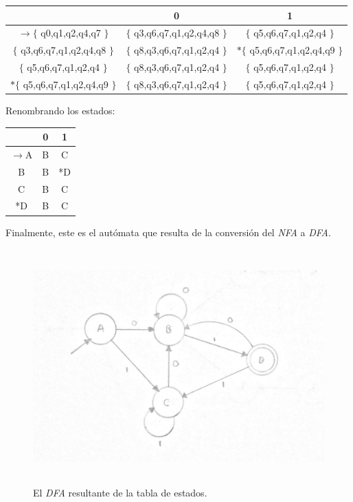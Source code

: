 \documentclass[12pt]{article}
\begin{document}
\begin{table}[H]
\centering
\begin{tabular}{|c|c|c|}
\hline 
 & 0 & 1 \\ 
\hline 
$\rightarrow\lbrace$ q0,q1,q2,q4,q7 $\rbrace$ & $\lbrace$ q3,q6,q7,q1,q2,q4,q8 $\rbrace$ & $\lbrace$ q5,q6,q7,q1,q2,q4 $\rbrace$ \\ 
\hline 
$\lbrace$ q3,q6,q7,q1,q2,q4,q8 $\rbrace$ & $\lbrace$ q8,q3,q6,q7,q1,q2,q4 $\rbrace$ & $*\lbrace$ q5,q6,q7,q1,q2,q4,q9 $\rbrace$ \\ 
\hline 
$\lbrace$ q5,q6,q7,q1,q2,q4 $\rbrace$ & $\lbrace$ q8,q3,q6,q7,q1,q2,q4 $\rbrace$ & $\lbrace$ q5,q6,q7,q1,q2,q4 $\rbrace$ \\ 
\hline 
$*\lbrace$ q5,q6,q7,q1,q2,q4,q9 $\rbrace$ & $\lbrace$ q8,q3,q6,q7,q1,q2,q4 $\rbrace$ & $\lbrace$ q5,q6,q7,q1,q2,q4 $\rbrace$ \\ 
\hline 
\end{tabular} 
\end{table}

\vspace{1em}
Renombrando los estados: \\

\begin{table}[H]	
\centering
\begin{tabular}{|c|c|c|}
\hline 
 & 0 & 1 \\ 
\hline 
$\rightarrow$A & B & C \\ 
\hline 
B & B & *D \\ 
\hline 
C & B & C \\ 
\hline 
*D & B & C \\ 
\hline 
\end{tabular} 
\end{table}

\vspace{1em}

Finalmente, este es el autómata que resulta de la conversión del \textit{NFA} a \textit{DFA}.

\begin{figure}[H]
\includegraphics[width=\textwidth, height=9cm]{dfa}
\caption{El \textit{DFA} resultante de la tabla de estados.}
\end{figure}
\end{document}
